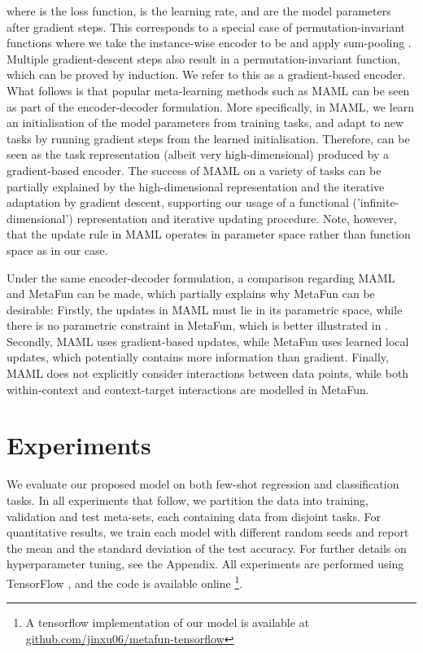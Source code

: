 \documentclass{article}
\theoremstyle{definition}
\begin{document}
where  is the loss function,  is the learning rate, and  are the model parameters after  gradient steps.
This corresponds to a special case of permutation-invariant functions where we take the instance-wise encoder to be  and apply sum-pooling . 
Multiple gradient-descent steps also result in a permutation-invariant function, which can be proved by induction. We refer to this as a gradient-based encoder.
What follows is that popular meta-learning methods such as \gls{MAML} can be seen as part of the encoder-decoder formulation.
More specifically, in \gls{MAML}, we learn an initialisation of the model parameters  from training tasks, and adapt to new tasks by running  gradient steps from the learned initialisation. Therefore,  can be seen as the task representation (albeit very high-dimensional) produced by a gradient-based encoder.
The success of \gls{MAML} on a variety of tasks can be partially explained by the high-dimensional representation and the iterative adaptation by gradient descent, supporting our usage of a functional ('infinite-dimensional') representation and iterative updating procedure. Note, however, that the update rule in \gls{MAML} operates in parameter space rather than function space as in our case. 

Under the same encoder-decoder formulation, a comparison regarding \gls{MAML} and MetaFun can be made, which partially explains why MetaFun can be desirable: Firstly, the updates in \gls{MAML} must lie in its parametric space, while there is no parametric constraint in MetaFun, which is better illustrated in . Secondly, \gls{MAML} uses gradient-based updates, while MetaFun uses learned local updates, which potentially contains more information than gradient. Finally, \gls{MAML} does not explicitly consider interactions between data points, while both within-context and context-target interactions are modelled in MetaFun.

\section{Experiments} \label{sec:experiments}


We evaluate our proposed model on both few-shot regression and classification tasks. 
In all experiments that follow, we partition the data into training, validation and test meta-sets, each containing data from disjoint tasks. 
For quantitative results, we train each model with  different random seeds and report the mean and the standard deviation of the test accuracy. For further details on hyperparameter tuning, see the Appendix. All experiments are performed using TensorFlow \citep{tensorflow2015-whitepaper}, and the code is available online \footnote{A tensorflow implementation of our model is available at \url{github.com/jinxu06/metafun-tensorflow}}.
\end{document}
